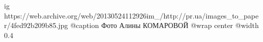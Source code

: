  
 
 
 
 

\ifcmt
  ig https://web.archive.org/web/20130524112926im_/http://pr.ua/images_to_paper/4fed92b209b85.jpg
	@caption Фото Алины КОМАРОВОЙ
  @wrap center
  @width 0.4
\fi

